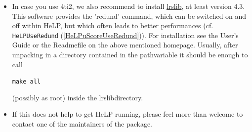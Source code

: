 \documentclass[a4paper,11pt]{report}
\begin{document}
{{\begin{itemize}
 \texttt{./configure
\texttt{}\texttt{}prefix=INSTALLATION\texttt{}DIRECTORY}

 \texttt{make}

 \texttt{make check}

 \texttt{make install\texttt{}exec}

 Depending on the settings of your system you might need root privileges (type \texttt{sudo} in front of every command) to unpack the files and install them. To check
whether the installation worked, you can enter \texttt{zsolve} in a terminal. In case one of the required programs (g++ or gmp) was not
installed when running \texttt{make} for the first time, you might need to run \texttt{make clean} and the above commands afterwards again (several times) to compile 4ti2
successfully. If you already have 4ti2 installed in a directory not contained
in the path\texttt{}variable and want to avoid a
re\texttt{}installation, in many cases the following helps: 
\begin{itemize}
\item  Start a terminal and access a path written in your bash or
system{\textunderscore}bash. Typically \texttt{usr/local/bin} should work. 

 
\item  Run \texttt{ln \texttt{}s /[PathToZsolve] zsolve}, where \texttt{[PathToZsolve]} is the path to the executable zsolve. This sets a symlink to the right place.
E.g. \texttt{ln \texttt{}s /opt/4ti2/bin/zsolve zsolve} was used on the (Linux) computers in Stuttgart. 
\end{itemize}
 
\item  In case you use 4ti2, we also recommend to install \href{https://cgm.cs.mcgill.ca/~avis/C/lrs.html} {lrslib}, at least version 4.3. This software provides the 'redund' command, which can
be switched on and off within HeLP, but which often leads to better
performances (cf. \texttt{HeLP{\textunderscore}UseRedund} (\ref{HeLPuScoreUseRedund})). For installation see the User's Guide or the Readme\texttt{}file
on the above mentioned homepage. Usually, after unpacking in a directory
contained in the path\texttt{}variable it should be enough to call

 \texttt{make all}

 (possibly as root) inside the lrslib\texttt{}directory. 
\item  If this does not help to get HeLP running, please feel more than welcome to
contact one of the maintainers of the package. 
\end{itemize}
 

}}
\end{document}
